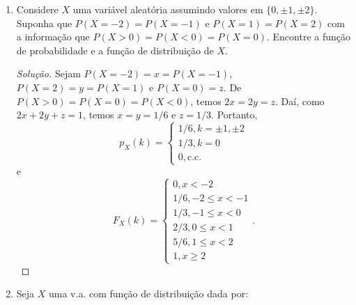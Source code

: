 \documentclass[../Notas.tex]{subfiles}
\begin{document}
\begin{enumerate}
\begin{proof}[Solução]
\begin{enumerate}[a)]
\[\begin{cases}
            0, y<n \\
            \frac{\binom{[y]}{n}}{\binom{r}{n}}, n\leq y < r \\
            1, y\geq r.
            \end{cases}
            \]
            \item Temos
            \[
            P(Z\geq z) = \begin{cases}
            1, z<1 \\
            \frac{\binom{r+1-z}{n}}{\binom{r}{n}}, z = 1, 2, \dots, r-n+1 \\
            \frac{\binom{r-[z]}{n}}{\binom{r}{n}}, i < z < i+1, i = 1, 2, \dots, r-n \\
            0, z > r-n+1
            \end{cases}.
            \]
        \end{enumerate}
    \end{proof}
    \item Considere $X$ uma variável aleatória assumindo valores em $\{0, \pm 1, \pm 2\}$. Suponha que $P(X = -2) = P(X = -1)$ e $P(X = 1) = P (X = 2)$ com a informação que $P(X > 0) = P(X < 0) = P(X = 0)$. Encontre a função de probabilidade e a função de distribuição de $X$.
    \begin{proof}[Solução]
        Sejam $P(X=-2) = x = P(X=-1)$, $P(X=2) = y = P(X=1)$ e $P(X=0) = z$. De
        $P(X>0) = P(X=0) = P(X<0)$, temos $2x = 2y = z$. Daí, como $2x + 2y + z = 1$, temos
        $x = y = 1/6$ e $z=1/3$. Portanto,
        \[
        p_X(k) = \begin{cases}
        1/6, k = \pm1, \pm2 \\
        1/3, k=0 \\
        0, \text{c.c.}
        \end{cases}
        \]
        e
        \[
        F_X(k) = \begin{cases}
        0, x<-2 \\
        1/6, -2\leq x < -1 \\
        1/3, -1\leq x < 0 \\
        2/3, 0\leq x < 1 \\
        5/6, 1\leq x < 2 \\
        1, x\geq 2
        \end{cases}.
        \]
    \end{proof}
    \item Seja $X$ uma v.a. com função de distribuição dada por:

\end{enumerate}
\end{document}
